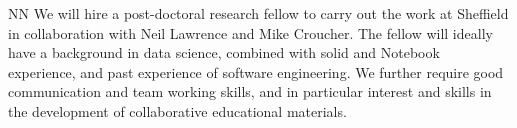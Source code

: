 \begin{participant}[type=R, PM=30]{NN}
  We will hire a post-doctoral research fellow to carry out the work
  at Sheffield in collaboration with Neil Lawrence and Mike
  Croucher. The fellow will ideally have a background in data science,
  combined with solid \IPython and \Jupyter{} Notebook experience, and
  past experience of software engineering. We further require good
  communication and team working skills, and in particular interest
  and skills in the development of collaborative educational
  materials. 
\end{participant}